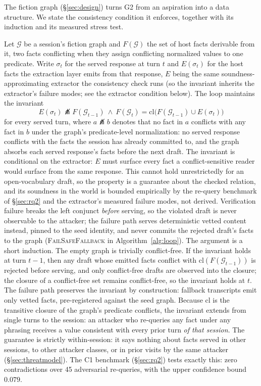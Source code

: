 The fiction graph (\S\ref{sec:design}) turns G2 from an aspiration into a
data structure. We state the consistency condition it enforces, together
with its induction and its measured stress test.\begin{property}
\label{prop:consistency}
Let $\mathcal{G}$ be a session's fiction graph and $F(\mathcal{G})$ the
set of host facts derivable from it, two facts conflicting when they assign
conflicting normalized values to one predicate. Write $\sigma_t$ for the
served response at turn $t$ and $E(\sigma_t)$ for the host facts the
extraction layer emits from that response, $E$ being the same
soundness-approximating extractor the consistency check runs (so the
invariant inherits the extractor's failure modes; see the extractor
condition below). The loop maintains the invariant
\begin{equation*}
E(\sigma_t) \not\pitchfork F(\mathcal{G}_{t-1}) \ \wedge \ F(\mathcal{G}_t) = \mathrm{cl}\big(F(\mathcal{G}_{t-1}) \cup E(\sigma_t)\big)
\end{equation*}
for every served turn, where $a \not\pitchfork b$ denotes that no fact
in $a$ conflicts with any fact in $b$ under the graph's predicate-level
normalization: no served response conflicts with the facts the session
has already committed to, and the graph absorbs each served response's
facts before the next draft. The invariant is conditional on the
extractor: $E$ must surface every fact a conflict-sensitive reader would
surface from the same response. This cannot hold unrestrictedly for an
open-vocabulary draft, so the property is a guarantee about the checked
relation, and its soundness in the world is bounded empirically by the
re-query benchmark of \S\ref{sec:rq2} and the extractor's measured
failure modes, not derived. Verification failure breaks the left
conjunct \emph{before} serving, so the violated draft is never
observable to the attacker; the failure path serves deterministic vetted
content instead, pinned to the seed identity, and never commits the
rejected draft's facts to the graph (\textsc{FailSafeFallback} in
Algorithm~\ref{alg:loop}). The argument is a short induction. The empty graph is
trivially conflict-free. If the invariant holds at turn $t-1$, then any
draft whose emitted facts conflict with $\mathrm{cl}(F(\mathcal{G}_{t-1}))$ is rejected
before serving, and only conflict-free drafts are observed into the
closure; the closure of a conflict-free set remains conflict-free, so the
invariant holds at $t$. The failure path preserves the invariant by
construction: fallback transcripts emit only vetted facts, pre-registered
against the seed graph. Because $\mathrm{cl}$ is the transitive closure of the
graph's predicate conflicts, the invariant extends from
single turns to the session: an attacker who re-queries any fact under any
phrasing receives a value consistent with every prior turn \emph{of that
session}. The guarantee is strictly within-session: it says nothing
about facts served in other sessions, to other attacker classes, or in
prior visits by the same attacker (\S\ref{sec:threatmodel}). The C1
benchmark (\S\ref{sec:rq2}) tests exactly this: zero contradictions over
45 adversarial re-queries, with the upper confidence bound $0.079$.
\end{property}

